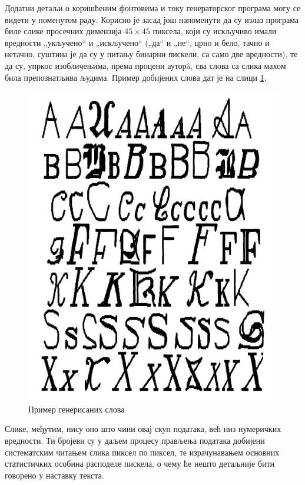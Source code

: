 \documentclass[a4paper]{article}
\begin{document}
Додатни детаљи о коришћеним фонтовима и току генераторског програма могу се видети у поменутом раду. Корисно је засад још напоменути да су излаз програма биле слике просечних димензија $45\times45$ пиксела, који су искључиво имали вредности „укључено“ и „искључено“ („да“ и „не“, црно и бело, тачно и нетачно, суштина је да су у питању бинарни пискели, са само две вредности), те да су, упркос изобличењима, према процени ауторâ, сва слова са слика махом била препознатљива људима. Пример добијених слова дат је на слици \ref{slova}.

\begin{figure}[h!]
\begin{center}
\includegraphics[scale=0.7]{../Slike za rad/Primer slova.png}
\end{center}
\caption{Пример генерисаних слова}
\label{slova}
\end{figure}

Слике, међутим, нису оно што чини овај скуп података, већ низ нумеричких вредности. Ти бројеви су у даљем процесу прављења података добијени систематским читањем слика пиксел по пиксел, те израчунавањем основних статистичких особина расподеле пискела, о чему ће нешто детаљније бити говорено у наставку текста.
\end{document}
